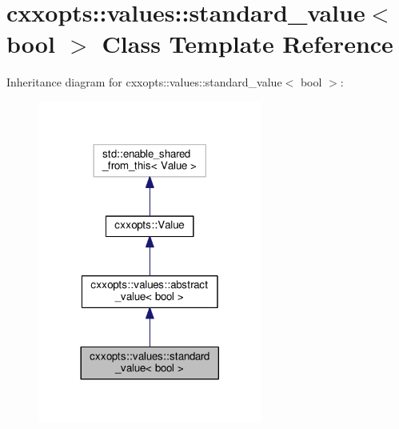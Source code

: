 \hypertarget{classcxxopts_1_1values_1_1standard__value_3_01bool_01_4}{}\section{cxxopts\+:\+:values\+:\+:standard\+\_\+value$<$ bool $>$ Class Template Reference}
\label{classcxxopts_1_1values_1_1standard__value_3_01bool_01_4}


Inheritance diagram for cxxopts\+:\+:values\+:\+:standard\+\_\+value$<$ bool $>$\+:
\nopagebreak
\begin{figure}[H]
\begin{center}
\leavevmode
\includegraphics[width=209pt]{classcxxopts_1_1values_1_1standard__value_3_01bool_01_4__inherit__graph}
\end{center}
\end{figure}


